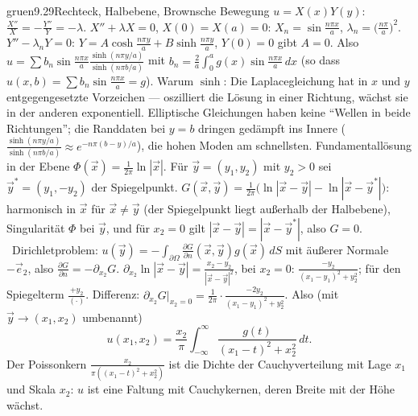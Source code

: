 \begin{loesungkarte}{gruen}{9.29}{Rechteck, Halbebene, Brownsche Bewegung}
$u = X(x)Y(y)$: $\frac{X''}X = -\frac{Y''}Y = -\lambda$. $X'' + \lambda X = 0$, $X(0) = X(a) = 0$: $X_n = \sin\frac{n\pi x}a$, $\lambda_n = \bigl(\frac{n\pi}a\bigr)^{2}$. $Y'' - \lambda_nY = 0$: $Y = A\cosh\frac{n\pi y}a + B\sinh\frac{n\pi y}a$, $Y(0) = 0$ gibt $A = 0$. Also $u = \sum b_n\sin\frac{n\pi x}a\frac{\sinh(n\pi y/a)}{\sinh(n\pi b/a)}$ mit $b_n = \frac2a\int_0^{a}g(x)\sin\frac{n\pi x}a\,dx$ (so dass $u(x, b) = \sum b_n\sin\frac{n\pi x}a = g$). Warum $\sinh$: Die Laplacegleichung hat in $x$ und $y$ entgegengesetzte Vorzeichen --- oszilliert die Lösung in einer Richtung, wächst sie in der anderen exponentiell. Elliptische Gleichungen haben keine \enquote{Wellen in beide Richtungen}; die Randdaten bei $y = b$ dringen gedämpft ins Innere ($\frac{\sinh(n\pi y/a)}{\sinh(n\pi b/a)}\approx e^{-n\pi(b - y)/a}$), die hohen Moden am schnellsten.
Fundamentallösung in der Ebene $\Phi(\vec x) = \frac1{2\pi}\ln|\vec x|$. Für $\vec y = (y_1, y_2)$ mit $y_2 > 0$ sei $\vec y^{*} = (y_1, -y_2)$ der Spiegelpunkt. $G(\vec x, \vec y) = \frac1{2\pi}\bigl(\ln|\vec x - \vec y| - \ln|\vec x - \vec y^{*}|\bigr)$: harmonisch in $\vec x$ für $\vec x\neq\vec y$ (der Spiegelpunkt liegt außerhalb der Halbebene), Singularität $\Phi$ bei $\vec y$, und für $x_2 = 0$ gilt $|\vec x - \vec y| = |\vec x - \vec y^{*}|$, also $G = 0$. \checkmark\ Dirichletproblem: $u(\vec y) = -\int_{\partial\Omega}\frac{\partial G}{\partial n}(\vec x, \vec y)g(\vec x)\,dS$ mit äußerer Normale $-\vec e_2$, also $\frac{\partial G}{\partial n} = -\partial_{x_2}G$. $\partial_{x_2}\ln|\vec x - \vec y| = \frac{x_2 - y_2}{|\vec x - \vec y|^{2}}$, bei $x_2 = 0$: $\frac{-y_2}{(x_1 - y_1)^{2} + y_2^{2}}$; für den Spiegelterm $\frac{+y_2}{(\cdot)}$. Differenz: $\partial_{x_2}G|_{x_2 = 0} = \frac1{2\pi}\cdot\frac{-2y_2}{(x_1 - y_1)^{2} + y_2^{2}}$. Also (mit $\vec y\to(x_1, x_2)$ umbenannt)
\[ u(x_1, x_2) = \frac{x_2}\pi\int_{-\infty}^{\infty}\frac{g(t)}{(x_1 - t)^{2} + x_2^{2}}\,dt. \]
Der Poissonkern $\frac{x_2}{\pi((x_1 - t)^{2} + x_2^{2})}$ ist die Dichte der Cauchyverteilung mit Lage $x_1$ und Skala $x_2$: $u$ ist eine Faltung mit Cauchykernen, deren Breite mit der Höhe wächst.

\end{loesungkarte}
